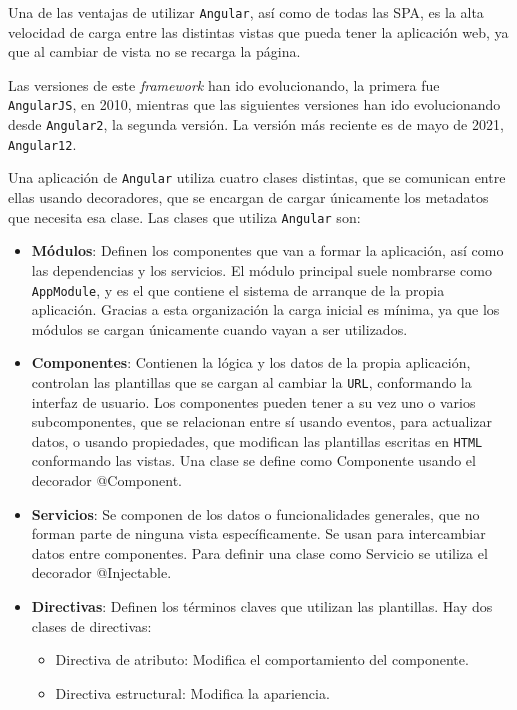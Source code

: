 \documentclass[a4paper, 12pt]{book}
\begin{document}
Una de las ventajas de utilizar \texttt{Angular}, así como de todas las SPA, es la alta velocidad de carga entre las distintas vistas que pueda tener la aplicación web, ya que al cambiar de vista no se recarga la página.

Las versiones de este \textit{framework} han ido evolucionando, la primera fue \texttt{AngularJS}, en 2010, mientras que las siguientes versiones han ido evolucionando desde \texttt{Angular2}, la segunda versión. La versión más reciente es de mayo de 2021, \texttt{Angular12}.

Una aplicación de \texttt{Angular} utiliza cuatro clases distintas, que se comunican entre ellas usando decoradores, que se encargan de cargar únicamente los metadatos que necesita esa clase. Las clases que utiliza \texttt{Angular} son:

\begin{itemize}
	\item \textbf{Módulos}: Definen los componentes que van a formar la aplicación, así como las dependencias y los servicios. El módulo principal suele nombrarse como \texttt{AppModule}, y es el que contiene el sistema de arranque de la propia aplicación. Gracias a esta organización la carga inicial es mínima, ya que los módulos se cargan únicamente cuando vayan a ser utilizados.
	\item \textbf{Componentes}: Contienen la lógica y los datos de la propia aplicación, controlan las plantillas que se cargan al cambiar la \texttt{URL}, conformando la interfaz de usuario. Los componentes pueden tener a su vez uno o varios subcomponentes, que se relacionan entre sí usando eventos, para actualizar datos, o usando propiedades, que modifican las plantillas escritas en \texttt{HTML} conformando las vistas. Una clase se define como Componente usando el decorador @Component.
	\item \textbf{Servicios}: Se componen de los datos o funcionalidades generales, que no forman parte de ninguna vista específicamente. Se usan para intercambiar datos entre componentes. Para definir una clase como Servicio se utiliza el decorador @Injectable.
	\item \textbf{Directivas}: Definen los términos claves que utilizan las plantillas. Hay dos clases de directivas:
	\begin{itemize}
		\item Directiva de atributo: Modifica el comportamiento del componente.
		\item Directiva estructural: Modifica la apariencia.
	\end{itemize}
\end{itemize}
\end{document}
